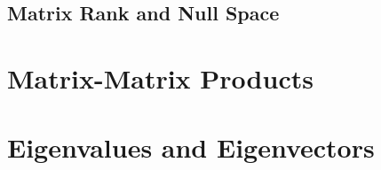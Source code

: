 \documentclass{article}
\begin{document}
\subsection{Matrix Rank and Null Space}

\section{Matrix-Matrix Products}

\section{Eigenvalues and Eigenvectors}
\end{document}
